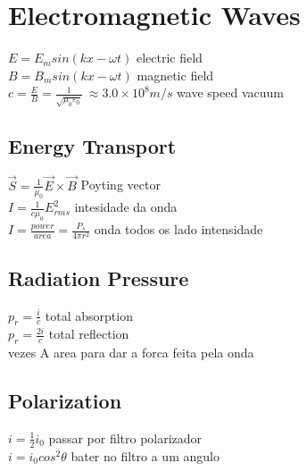 \section{Electromagnetic Waves}
$E=E_msin\left(kx-\omega t\right)$ electric field\\
$B=B_msin\left(kx-\omega t\right)$ magnetic field\\
$c=\frac{E}{B}=\frac{1}{\sqrt{\mu _0\varepsilon _0}}\:\approx 3.0\times 10^8m/s$ wave speed vacuum\\
\subsection{Energy Transport}
$\vec{S}=\frac{1}{\mu _0}\vec{E}\times \vec{B}$ Poyting vector\\
$I=\frac{1}{c\mu _0}E^2_{rms}$ intesidade da onda\\
$I=\frac{power}{area}=\frac{P_s}{4\pi r^2}$ onda todos os lado intensidade\\
\subsection{Radiation Pressure}
$p_r=\frac{i}{c}$ total absorption\\
$p_r=\frac{2i}{c}$ total reflection\\
vezes A area para dar a forca feita pela onda\\
\subsection{Polarization}
$i=\frac{1}{2}i_0$ passar por filtro polarizador\\
$i=i_0cos^2\theta $ bater no filtro a um angulo\\